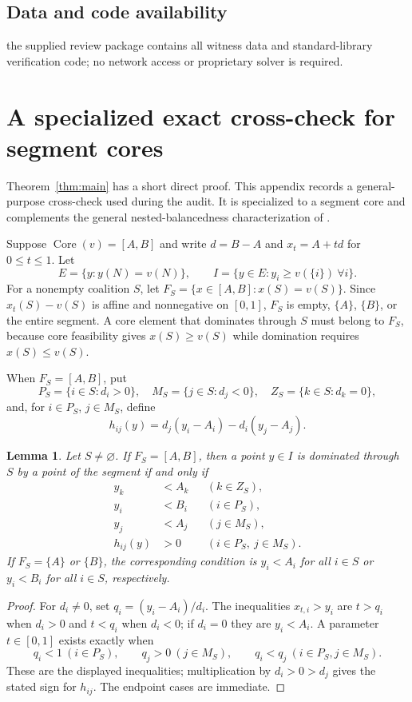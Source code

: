\documentclass[11pt]{article}
\newtheorem{lemma}[theorem]{Lemma}
\newcommand{\core}{\operatorname{Core}}
\begin{document}
\subsection*{Data and code availability}
 the supplied review package contains all
witness data and standard-library verification code; no network access or
proprietary solver is required.

\appendix

\section{A specialized exact cross-check for segment cores}
\label{app:arrangement}

Theorem~\ref{thm:main} has a short direct proof. This appendix records a
general-purpose cross-check used during the audit. It is specialized to a
segment core and complements the general nested-balancedness characterization
of \citet{GrabischSudholter2024}.

Suppose $\core(v)=[A,B]$ and write $d=B-A$ and
$x_t=A+td$ for $0\le t\le1$. Let
\[
 E=\{y:y(N)=v(N)\},\qquad
 I=\{y\in E:y_i\ge v(\{i\})\ \forall i\}.
\]
For a nonempty coalition $S$, let
$F_S=\{x\in[A,B]:x(S)=v(S)\}$. Since $x_t(S)-v(S)$ is affine and
nonnegative on $[0,1]$, $F_S$ is empty, $\{A\}$, $\{B\}$, or the entire
segment. A core element that dominates through $S$ must belong to $F_S$,
because core feasibility gives $x(S)\ge v(S)$ while domination requires
$x(S)\le v(S)$.

When $F_S=[A,B]$, put
\[
 P_S=\{i\in S:d_i>0\},\quad
 M_S=\{j\in S:d_j<0\},\quad
 Z_S=\{k\in S:d_k=0\},
\]
and, for $i\in P_S$, $j\in M_S$, define
\[
 h_{ij}(y)=d_j(y_i-A_i)-d_i(y_j-A_j).
\]

\begin{lemma}\label{lem:domformula}
Let $S\ne\varnothing$. If $F_S=[A,B]$, then a point $y\in I$ is dominated through $S$ by a point of
the segment if and only if
\[
\begin{aligned}
 y_k&<A_k &&(k\in Z_S),\\
 y_i&<B_i &&(i\in P_S),\\
 y_j&<A_j &&(j\in M_S),\\
 h_{ij}(y)&>0 &&(i\in P_S,\ j\in M_S).
\end{aligned}
\]
If $F_S=\{A\}$ or $\{B\}$, the corresponding condition is
$y_i<A_i$ for all $i\in S$ or $y_i<B_i$ for all $i\in S$, respectively.
\end{lemma}

\begin{proof}
For $d_i\ne0$, set $q_i=(y_i-A_i)/d_i$. The inequalities
$x_{t,i}>y_i$ are $t>q_i$ when $d_i>0$ and $t<q_i$ when $d_i<0$; if
$d_i=0$ they are $y_i<A_i$. A parameter $t\in[0,1]$ exists exactly when
\[
 q_i<1\ (i\in P_S),\qquad q_j>0\ (j\in M_S),\qquad
 q_i<q_j\ (i\in P_S,j\in M_S).
\]
These are the displayed inequalities; multiplication by
$d_i>0>d_j$ gives the stated sign for $h_{ij}$. The endpoint cases are
immediate.
\end{proof}
\end{document}
